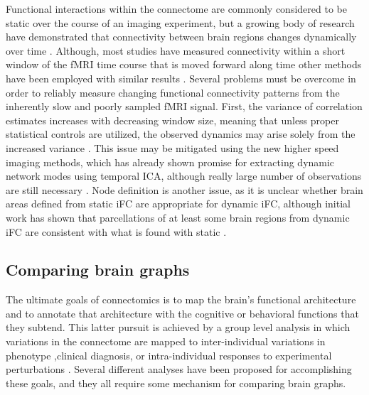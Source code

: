 Functional interactions within the connectome are commonly considered to be static over the course of an imaging experiment, but a growing body of research have demonstrated that connectivity between brain regions changes dynamically over time \cite{Hutchinson2013}. Although, most studies have measured connectivity within a short window of the fMRI time course that is moved forward along time \cite{Keilholz2013,Chang2010,Yang2014,Allen2014} other methods have been employed with similar results \cite{Majeed2011,Smith2102}. Several problems must be overcome in order to reliably measure changing functional connectivity patterns from the inherently slow and poorly sampled fMRI signal. First, the variance of correlation estimates increases with decreasing window size, meaning that unless proper statistical controls are utilized, the observed dynamics may arise solely from the increased variance \cite{Handwerker2012}. This issue may be mitigated using the new higher speed imaging methods, which has already shown promise for extracting dynamic network modes using temporal ICA, although really large number of observations are still necessary \cite{Smith2012}. Node definition is another issue, as it is unclear whether brain areas defined from static iFC are appropriate for dynamic iFC, although initial work has shown that parcellations of at least some brain regions from dynamic iFC are consistent with what is found with static \cite{Yang2014}.

\subsection{Comparing brain graphs} 

The ultimate goals of connectomics is to map the brain's functional architecture and to annotate that architecture with the cognitive or behavioral functions that they subtend. This latter pursuit is achieved by a group level analysis in which variations in the connectome are mapped to inter-individual variations in phenotype \cite{Kelly2012},clinical diagnosis\cite{Castellanos2013}, or intra-individual responses to experimental perturbations \cite{Shirer2012}. Several different analyses have been proposed for accomplishing these goals, and they all require some mechanism for comparing brain graphs\cite{Varoquaux2013}. 
 
